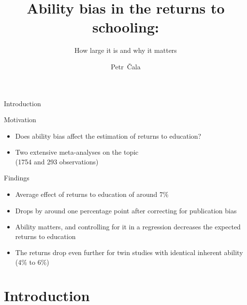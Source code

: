 \documentclass{beamer} %
\title[Ability bias and education] %
{Ability bias in the returns to schooling:}
\subtitle{How large it is and why it matters}
\author {Petr~\v{C}ala}
\institute[CUNI]
{
  Institute of Economic Studies\\
  Charles University, Prague\\
 
  \vspace{1.5em}

  \pgfdeclareimage[height=1.5cm]{logo}{Figures/logo.pdf} %
  \pgfuseimage{logo}

}
\date[June 19, 2024]
\begin{document}
\begin{frame}
    \titlepage
\end{frame}




\begin{frame}{Introduction}

    \begin{large}
        Motivation
    \end{large}

    \begin{itemize}
        \item Does ability bias affect the estimation of returns to education?
        \item Two extensive meta-analyses on the topic\\(1754 and 293 observations)
    \end{itemize}

    \begin{large}
        Findings
    \end{large}

    \begin{itemize}
        \item Average effect of returns to education of around 7\%
        \item Drops by around one percentage point after correcting for publication bias
        \item  Ability matters, and controlling for it in a regression decreases the expected returns to education
        \item  The returns drop even further for twin studies with identical inherent ability (4\% to 6\%)
    \end{itemize}

\end{frame}

\section{Introduction}
\subsection{}
\end{document}
